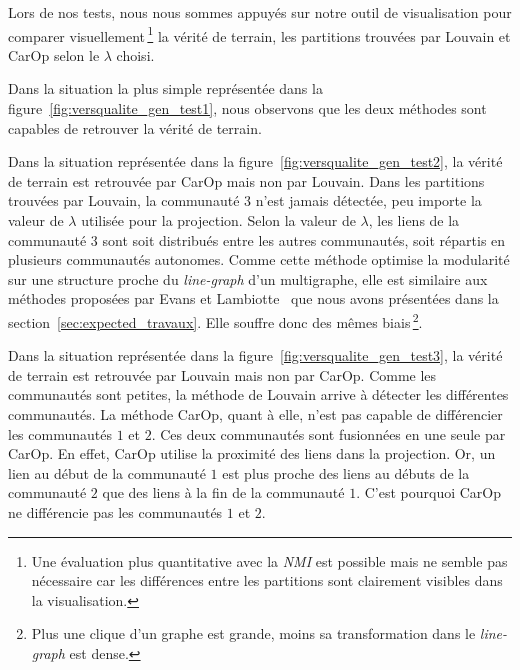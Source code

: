 Lors de nos tests, nous nous sommes appuyés sur notre outil de visualisation pour comparer visuellement\,\footnote{Une évaluation plus quantitative avec la \emph{NMI} est possible mais ne semble pas nécessaire car les différences entre les partitions sont clairement visibles dans la visualisation.} la vérité de terrain, les partitions trouvées par Louvain et CarOp selon le $\lambda$ choisi.

\bigskip

Dans la situation la plus simple représentée dans la figure~\ref{fig:versqualite_gen_test1}, nous observons que les deux méthodes sont capables de retrouver la vérité de terrain.

Dans la situation représentée dans la figure~\ref{fig:versqualite_gen_test2}, la vérité de terrain est retrouvée par CarOp mais non par Louvain.
Dans les partitions trouvées par Louvain, la communauté $3$ n'est jamais détectée, peu importe la valeur de $\lambda$ utilisée pour la projection.
Selon la valeur de $\lambda$, les liens de la communauté $3$ sont soit distribués entre les autres communautés, soit répartis en plusieurs communautés autonomes.
Comme cette méthode optimise la modularité sur une structure proche du \emph{line-graph} d'un multigraphe, elle est similaire aux méthodes proposées par Evans et Lambiotte~\cite{Evans2009} que nous avons présentées dans la section~\ref{sec:expected_travaux}.
Elle souffre donc des mêmes biais\,\footnote{Plus une clique d'un graphe est grande, moins sa transformation dans le \emph{line-graph} est dense.}.

Dans la situation représentée dans la figure~\ref{fig:versqualite_gen_test3}, la vérité de terrain est retrouvée par Louvain mais non par CarOp.
Comme les communautés sont petites, la méthode de Louvain arrive à détecter les différentes communautés.
La méthode CarOp, quant à elle, n'est pas capable de différencier les communautés $1$ et $2$.
Ces deux communautés sont fusionnées en une seule par CarOp.
En effet, CarOp utilise la proximité des liens dans la projection.
Or, un lien au début de la communauté $1$ est plus proche des liens au débuts de la communauté $2$ que des liens à la fin de la communauté $1$.
C'est pourquoi CarOp ne différencie pas les communautés $1$ et $2$.





